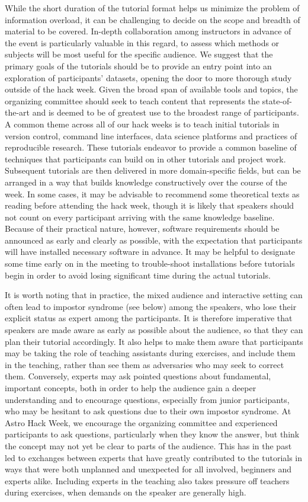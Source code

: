 \documentclass{aastex62}
\begin{document}
While the short duration of the tutorial format helps us minimize the problem of information overload, it can be challenging to decide on the scope and breadth of material to be covered. In-depth collaboration among instructors in advance of the event is particularly valuable in this regard, to assess which methods or subjects will be most useful for the specific audience. We suggest that the primary goals of the tutorials should be to provide an entry point into an exploration of participants' datasets, opening the door to more thorough study outside of the hack week. Given the broad span of available tools and topics, the organizing committee should seek to teach content that represents the state-of-the-art and is deemed to be of greatest use to the broadest range of participants. A common theme across all of our hack weeks is to teach initial tutorials in version control, command line interfaces, data science platforms and practices of reproducible research. These tutorials endeavor to provide a common baseline of techniques that participants can build on in other tutorials and project work. Subsequent tutorials are then delivered in more domain-specific fields, but can be arranged in a way that builds knowledge constructively over the course of the week. In some cases, it may be advisable to recommend some theoretical texts as reading before attending the hack week, though it is likely that speakers should not count on every participant arriving with the same knowledge baseline. Because of their practical nature, however, software requirements should be announced as early and clearly as possible, with the expectation that participants will have installed necessary software in advance. It may be helpful to designate some time early on in the meeting to trouble-shoot installations before tutorials begin in order to avoid losing significant time during the actual tutorials.

It is worth noting that in practice, the mixed audience and interactive setting can often lead to impostor syndrome (see below) among the speakers, who lose their explicit status as expert among the participants. It is therefore imperative that speakers are made aware as early as possible about the audience, so that they can plan their tutorial accordingly. It also helps to make them aware that participants may be taking the role of teaching assistants during exercises, and include them in the teaching, rather than see them as adversaries who may seek to correct them. Conversely, experts may ask pointed questions about fundamental, important concepts, both in order to help the audience gain a deeper understanding and to encourage questions, especially from junior participants, who may be hesitant to ask questions due to their own impostor syndrome. At Astro Hack Week, we encourage the organizing committee and experienced participants to ask questions, particularly when they know the answer, but think the concept may not yet be clear to parts of the audience. This has in the past led to exchanges between experts that have greatly contributed to the tutorials in ways that were both unplanned and unexpected for all involved, beginners and experts alike. Including experts in the teaching also takes pressure off teachers during exercises, when demands on the speaker are generally high.
\end{document}
